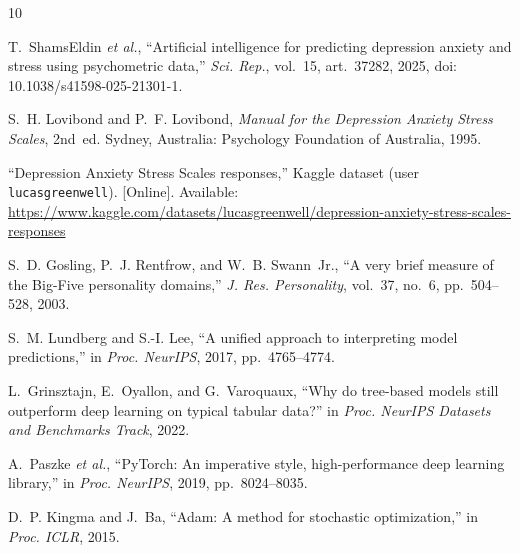 \documentclass[conference,compsoc]{IEEEtran}
\begin{document}
\begin{thebibliography}{10}

T.~ShamsEldin \emph{et al.}, ``Artificial intelligence for predicting depression anxiety and stress using psychometric data,'' \emph{Sci. Rep.}, vol.~15, art.~37282, 2025, doi: 10.1038/s41598-025-21301-1.

S.~H. Lovibond and P.~F. Lovibond, \emph{Manual for the Depression Anxiety Stress Scales}, 2nd~ed. Sydney, Australia: Psychology Foundation of Australia, 1995.

``Depression Anxiety Stress Scales responses,'' Kaggle dataset (user \texttt{lucasgreenwell}). [Online]. Available: \url{https://www.kaggle.com/datasets/lucasgreenwell/depression-anxiety-stress-scales-responses}

S.~D. Gosling, P.~J. Rentfrow, and W.~B. Swann~Jr., ``A very brief measure of the Big-Five personality domains,'' \emph{J. Res. Personality}, vol.~37, no.~6, pp.~504--528, 2003.

S.~M. Lundberg and S.-I. Lee, ``A unified approach to interpreting model predictions,'' in \emph{Proc. NeurIPS}, 2017, pp.~4765--4774.

L.~Grinsztajn, E.~Oyallon, and G.~Varoquaux, ``Why do tree-based models still outperform deep learning on typical tabular data?'' in \emph{Proc. NeurIPS Datasets and Benchmarks Track}, 2022.

A.~Paszke \emph{et al.}, ``PyTorch: An imperative style, high-performance deep learning library,'' in \emph{Proc. NeurIPS}, 2019, pp.~8024--8035.

D.~P. Kingma and J.~Ba, ``Adam: A method for stochastic optimization,'' in \emph{Proc. ICLR}, 2015.

\end{thebibliography}
\end{document}
